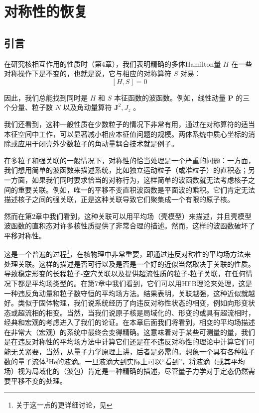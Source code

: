 
\chapter{对称性的恢复\label{chap:=005BF9=0079F0=006027=007684=006062=00590D}}

\section{引言}

在研究核相互作用的性质时（第4章），我们表明精确的多体Hamilton量 $H$ 在一些对称操作下是不变的，也就是说，它与相应的对称算符
$S$ 对易：
\[
[H,S]=0\tag{11.1}
\]

因此，我们总能找到同时是 $H$ 和 $S$ 本征函数的波函数。例如，线性动量 $\boldsymbol{P}$ 的三个分量、粒子数
$N$ 以及角动量算符 $\boldsymbol{J}^{2},J_{z}$ 。

我们还看到，这种一般性质在少数粒子的情况下非常有用，通过在对称算符的适当本征空间中工作，可以显著减小相应本征值问题的规模。两体系统中质心坐标的消除或应用于闭壳外少数粒子的角动量耦合技术就是例子。

在多粒子和强关联的一般情况下，对称性的恰当处理是一个严重的问题：一方面，我们想用简单的波函数来描述系统，比如独立运动粒子（或准粒子）的直积态；另一方面，如果我们同时要求恰当的对称行为，这样简单的波函数就无法考虑核子之间的重要关联。例如，唯一的平移不变直积波函数是平面波的乘积。它们肯定无法描述核子之间的强关联，正是这种关联导致它们聚集成一个有限的原子核。

然而在第2章中我们看到，这种关联可以用平均场（壳模型）来描述，并且壳模型波函数的直积态对许多核性质提供了非常合理的描述。然而，这样的波函数破坏了平移对称性。

这是一个普遍的过程\footnote{关于这一点的更详细讨论，见\cite{Li60a}}，在核物理中非常重要，即通过违反对称性的平均场方法来处理关联。这样的描述是否可行以及是否是一个好的近似当然取决于关联的性质。导致稳定形变的长程粒子-空穴关联以及提供超流性质的粒子-粒子关联，在任何情况下都是平均场类型的。在第7章中我们看到，它们可以用HFB理论来处理，这是一种违反角动量和粒子数守恒的平均场方法。结果表明，关联越强，这种近似就越好。类似于固体物理，我们说系统经历了向违反对称性状态的相变，例如向形变状态或超流相的相变。当然，当我们说原子核是局域化的、形变的或具有超流相时，经典和宏观的考虑进入了我们的论证。在本章后面我们将看到，相变的平均场描述在非常大（宏观）的系统中最终会变得精确。这意味着对于某些可测量的量，我们是在违反对称性的平均场方法中计算它们还是在不违反对称性的理论中计算它们可能无关紧要，当然，从量子力学原理上讲，后者是必需的。想象一个具有各种粒子数的量子流体$^{3}\mathrm{He}$的液滴。一旦液滴大到实际上可以“看到”，将液滴（或其平均场）视为局域化的（波包）肯定是一种精确的描述，尽管量子力学对于定态仍然需要平移不变的处理。

